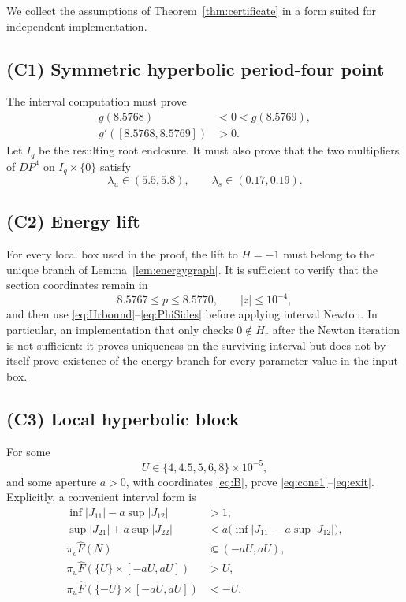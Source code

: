 \documentclass[11pt]{article}
\begin{document}
We collect the assumptions of Theorem~\ref{thm:certificate} in a form suited
for independent implementation.

\subsection*{(C1) Symmetric hyperbolic period-four point}

The interval computation must prove
\begin{align}
 g(8.5768)&<0<g(8.5769),\label{eq:C1a}\\
 g'([8.5768,8.5769])&>0.\label{eq:C1b}
\end{align}
Let $I_q$ be the resulting root enclosure.  It must also prove that the two
multipliers of $DP^4$ on $I_q\times\{0\}$ satisfy
\begin{equation}\label{eq:C1c}
 \lambda_u\in(5.5,5.8),
 \qquad
 \lambda_s\in(0.17,0.19).
\end{equation}

\subsection*{(C2) Energy lift}

For every local box used in the proof, the lift to $H=-1$ must belong to the
unique branch of Lemma~\ref{lem:energygraph}.  It is sufficient to verify
that the section coordinates remain in
\[
 8.5767\le p\le8.5770,
 \qquad
 |z|\le10^{-4},
\]
and then use \eqref{eq:Hrbound}--\eqref{eq:PhiSides} before applying interval
Newton.  In particular, an implementation that only checks
$0\notin H_r$ after the Newton iteration is not sufficient: it proves
uniqueness on the surviving interval but does not by itself prove existence
of the energy branch for every parameter value in the input box.

\subsection*{(C3) Local hyperbolic block}

For some
\[
 U\in\{4,4.5,5,6,8\}\times10^{-5},
\]
and some aperture $a>0$, with coordinates \eqref{eq:B}, prove
\eqref{eq:cone1}--\eqref{eq:exit}.  Explicitly, a convenient interval form is
\begin{align}
 \inf |J_{11}|-a\sup|J_{12}|&>1,\label{eq:C3a}\\
 \sup|J_{21}|+a\sup|J_{22}|
 &<
 a\bigl(\inf |J_{11}|-a\sup|J_{12}|\bigr),\label{eq:C3b}\\
 \pi_v\widehat F(N)&\Subset(-aU,aU),\label{eq:C3c}\\
 \pi_u\widehat F(\{U\}\times[-aU,aU])&>U,\label{eq:C3d}\\
 \pi_u\widehat F(\{-U\}\times[-aU,aU])&<-U.\label{eq:C3e}
\end{align}
\end{document}
